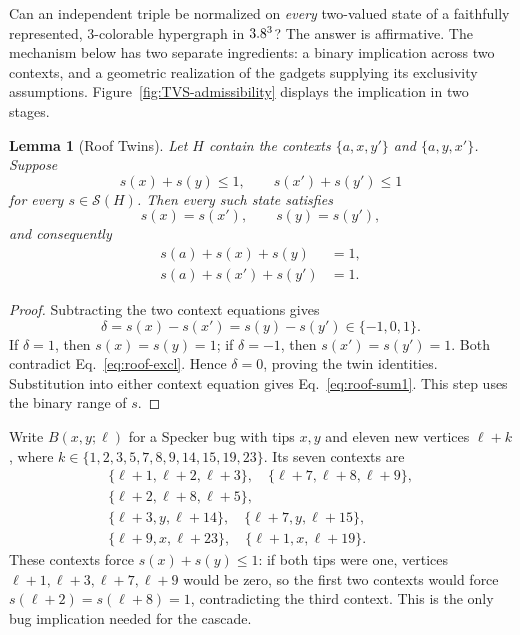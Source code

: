 \documentclass[aps,pra,reprint,superscriptaddress,longbibliography,nofootinbib,floatfix,10pt]{revtex4-2}
\newtheorem{lemma}[theorem]{Lemma}
\theoremstyle{definition}\newtheorem{definition}[theorem]{Definition}
\theoremstyle{remark}\newtheorem{remark}[theorem]{Remark}
\newcommand{\Sc}{\mathcal S}\newcommand{\Cc}{\mathcal C}\newcommand{\Wc}{\mathcal W}
\begin{document}
Can an independent triple be normalized on \emph{every} two-valued state of a faithfully represented, $3$-colorable hypergraph in $3.8^3$? The answer is affirmative. The mechanism below has two separate ingredients: a binary implication across two contexts, and a geometric realization of the gadgets supplying its exclusivity assumptions. Figure~\ref{fig:TVS-admissibility} displays the implication in two stages.

\begin{lemma}[Roof Twins]\label{lem:roof-twin}
Let $H$ contain the contexts $\{a,x,y'\}$ and $\{a,y,x'\}$. Suppose
\begin{equation}\label{eq:roof-excl}
s(x)+s(y)\le1,\qquad s(x')+s(y')\le1
\end{equation}
for every $s\in\Sc(H)$. Then every such state satisfies
\begin{equation}\label{eq:roof-twins}
s(x)=s(x'),\qquad s(y)=s(y'),
\end{equation}
and consequently
\begin{equation}\label{eq:roof-sum1}
\begin{aligned}
s(a)+s(x)+s(y)&=1,\\
s(a)+s(x')+s(y')&=1.
\end{aligned}
\end{equation}
\end{lemma}
\begin{proof}
Subtracting the two context equations gives
\[
\delta=s(x)-s(x')=s(y)-s(y')\in\{-1,0,1\}.
\]
If $\delta=1$, then $s(x)=s(y)=1$; if $\delta=-1$, then $s(x')=s(y')=1$. Both contradict Eq.~\eqref{eq:roof-excl}. Hence $\delta=0$, proving the twin identities. Substitution into either context equation gives Eq.~\eqref{eq:roof-sum1}. This step uses the binary range of $s$.
\end{proof}

Write $B(x,y;\ell)$ for a Specker bug with tips $x,y$ and eleven new vertices $\ell+k$, where $k\in\{1,2,3,5,7,8,9,14,15,19,23\}$. Its seven contexts are
\begin{equation}\label{eq:roof-bug-contexts}
\begin{gathered}
\{\ell+1,\ell+2,\ell+3\},\quad
\{\ell+7,\ell+8,\ell+9\},\\
\{\ell+2,\ell+8,\ell+5\},\\
\{\ell+3,y,\ell+14\},\quad
\{\ell+7,y,\ell+15\},\\
\{\ell+9,x,\ell+23\},\quad
\{\ell+1,x,\ell+19\}.
\end{gathered}
\end{equation}
These contexts force $s(x)+s(y)\le1$: if both tips were one, vertices $\ell+1,\ell+3,\ell+7,\ell+9$ would be zero, so the first two contexts would force $s(\ell+2)=s(\ell+8)=1$, contradicting the third context. This is the only bug implication needed for the cascade.
\end{document}
